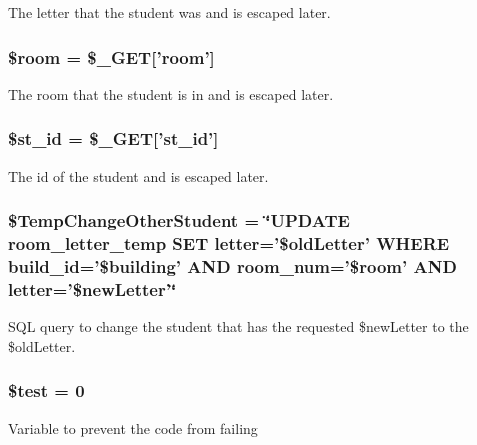 \-The letter that the student was and is escaped later. \hypertarget{updateStudentLetter_8php_ab285a2e759ea45a70f8ff40a63d2fe89}{
\subsubsection[{\$room}]{\setlength{\rightskip}{0pt plus 5cm}\$room = \$\-\_\-\-G\-E\-T\mbox{[}'room'\mbox{]}}}\label{updateStudentLetter_8php_ab285a2e759ea45a70f8ff40a63d2fe89}
\-The room that the student is in and is escaped later. \hypertarget{updateStudentLetter_8php_ab68b86e23fd74e101c03130a49b24f66}{
\subsubsection[{\$st\-\_\-id}]{\setlength{\rightskip}{0pt plus 5cm}\$st\-\_\-id = \$\-\_\-\-G\-E\-T\mbox{[}'st\-\_\-id'\mbox{]}}}\label{updateStudentLetter_8php_ab68b86e23fd74e101c03130a49b24f66}
\-The id of the student and is escaped later. \hypertarget{updateStudentLetter_8php_a7f985a3a1771038a28cc4019ea3b818e}{
\subsubsection[{\$\-Temp\-Change\-Other\-Student}]{\setlength{\rightskip}{0pt plus 5cm}\$\-Temp\-Change\-Other\-Student = \char`\"{}\-U\-P\-D\-A\-T\-E room\-\_\-letter\-\_\-temp \-S\-E\-T letter='\$old\-Letter' \-W\-H\-E\-R\-E build\-\_\-id='\$building' \-A\-N\-D room\-\_\-num='\$room' \-A\-N\-D letter='\$new\-Letter'\char`\"{}}}\label{updateStudentLetter_8php_a7f985a3a1771038a28cc4019ea3b818e}
\-S\-Q\-L query to change the student that has the requested \$new\-Letter to the \$old\-Letter. \hypertarget{updateStudentLetter_8php_a31daebf88fc668f410293e2c70cea3fc}{
\subsubsection[{\$test}]{\setlength{\rightskip}{0pt plus 5cm}\$test = 0}}\label{updateStudentLetter_8php_a31daebf88fc668f410293e2c70cea3fc}
\-Variable to prevent the code from failing 